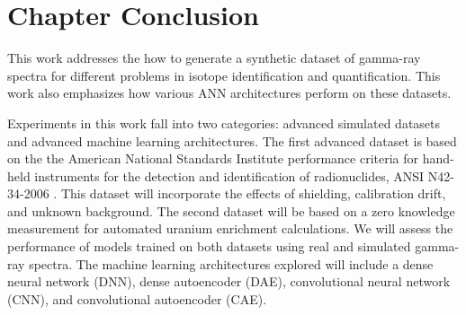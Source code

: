 \section{Chapter Conclusion}

This work addresses the how to generate a synthetic dataset of gamma-ray spectra for different problems in isotope identification and quantification. This work also emphasizes how various ANN architectures perform on these datasets. %

Experiments in this work fall into two categories: advanced simulated datasets and advanced machine learning architectures. The first advanced dataset is based on the the American National Standards Institute performance criteria for hand-held instruments for the detection and identification of radionuclides, ANSI N42-34-2006 \cite{ANSI}. This dataset will incorporate the effects of shielding, calibration drift, and unknown background. The second dataset will be based on a zero knowledge measurement for automated uranium enrichment calculations. We will assess the performance of models trained on both datasets using real and simulated gamma-ray spectra. The machine learning architectures explored will include a dense neural network (DNN), dense autoencoder (DAE), convolutional neural network (CNN), and convolutional autoencoder (CAE).